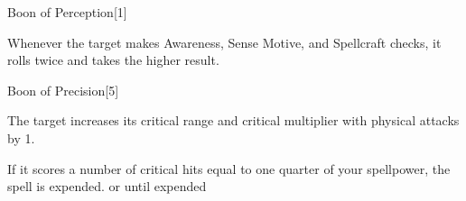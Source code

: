 \begin{spellsection}{Boon of Perception}[1]
    \begin{spellheader}
    \end{spellheader}
    \begin{spellcontent}
        \begin{spelltargetinginfo}
        \end{spelltargetinginfo}
        \begin{spelleffects}
            \spelleffect Whenever the target makes Awareness, Sense Motive, and Spellcraft checks, it rolls twice and takes the higher result.
            \spelldur \durshort
        \end{spelleffects}
    \end{spellcontent}
    \begin{spellfooter}
        \miscastrandom
    \end{spellfooter}
    \begin{spellaugments}
    \end{spellaugments}
\end{spellsection}

\begin{spellsection}{Boon of Precision}[5]
    \begin{spellheader}
    \end{spellheader}
    \begin{spellcontent}
        \begin{spelltargetinginfo}
        \end{spelltargetinginfo}
        \begin{spelleffects}
            \spelleffect The target increases its critical range and critical multiplier with physical attacks by 1.

            If it scores a number of critical hits equal to one quarter of your spellpower, the spell is expended.
            \spelldur \durshort or until expended
        \end{spelleffects}
    \end{spellcontent}
    \begin{spellfooter}
        \miscastrandom
    \end{spellfooter}
\end{spellsection}


